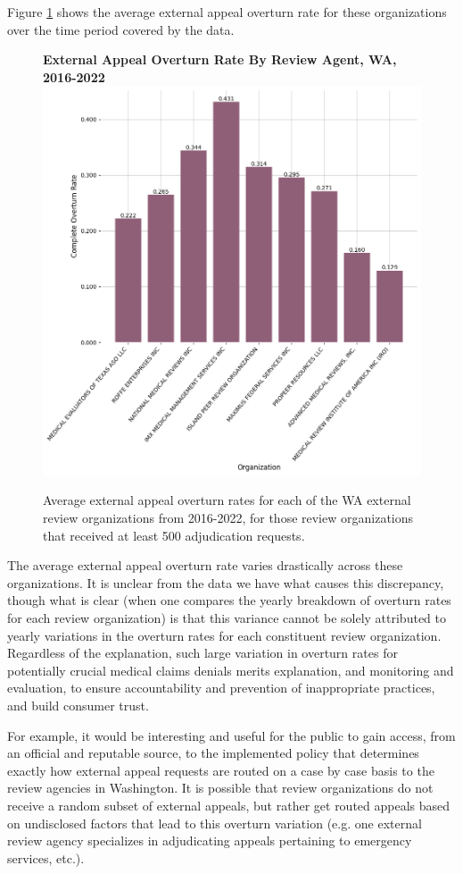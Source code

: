 \documentclass[12pt, a4paper,twoside]{report}
\theoremstyle{plain} %
\theoremstyle{definition} %
\theoremstyle{remark} %
\numberwithin{equation}{chapter}
\begin{document}
		Figure \ref{waexternalappealoverturnratebyreviewagent} shows the average external appeal overturn rate for these organizations over the time period covered by the data.
		
		
		\begin{figure}[h!]
			\centering
			\textbf{External Appeal Overturn Rate By Review Agent, WA, 2016-2022}
			\includegraphics[width=.8\textwidth]{images/wa_external_appeals/external_appeal_overturn_rates_by_agent.png}
			\caption{Average external appeal overturn rates for each of the WA external review organizations from 2016-2022, for those review organizations that received at least 500 adjudication requests.}
			\label{waexternalappealoverturnratebyreviewagent}
		\end{figure}
	
		The average external appeal overturn rate varies drastically across these organizations. It is unclear from the data we have what causes this discrepancy, though what is clear (when one compares the yearly breakdown of overturn rates for each review organization) is that this variance cannot be solely attributed to yearly variations in the overturn rates for each constituent review organization. Regardless of the explanation, such large variation in overturn rates for potentially crucial medical claims denials merits explanation, and monitoring and evaluation, to ensure accountability and prevention of inappropriate practices, and build consumer trust.
		
		For example, it would be interesting and useful for the public to gain access, from an official and reputable source, to the implemented policy that determines exactly how external appeal requests are routed on a case by case basis to the review agencies in Washington. It is possible that review organizations do not receive a random subset of external appeals, but rather get routed appeals based on undisclosed factors that lead to this overturn variation (e.g. one external review agency specializes in adjudicating appeals pertaining to emergency services, etc.).
		
\end{document}
